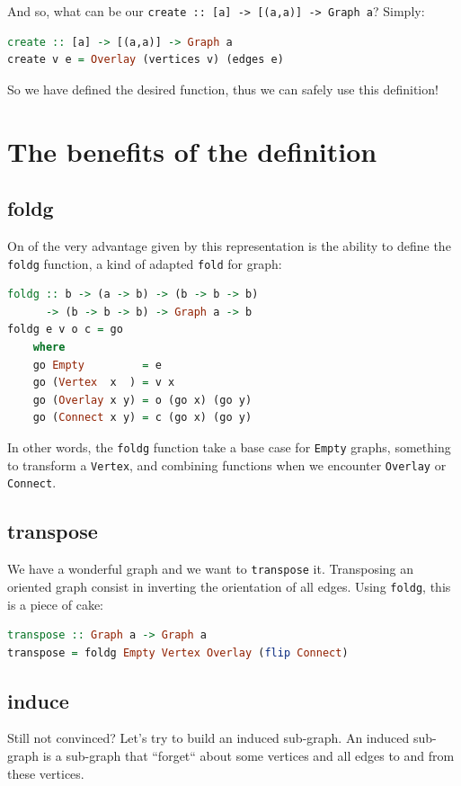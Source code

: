 \documentclass[10pt,a4paper]{article}
\begin{document}
And so, what can be our \verb|create :: [a] -> [(a,a)] -> Graph a|? Simply:
\begin{lstlisting}[language=Haskell, frame=single]
create :: [a] -> [(a,a)] -> Graph a
create v e = Overlay (vertices v) (edges e)
\end{lstlisting}

So we have defined the desired function, thus we can safely use this definition!

\section{The benefits of the definition}
\subsection{foldg}
On of the very advantage given by this representation is the ability to define the \verb|foldg| function, a kind of adapted \verb|fold| for graph:
\begin{lstlisting}[language=Haskell, frame=single]
foldg :: b -> (a -> b) -> (b -> b -> b)
      -> (b -> b -> b) -> Graph a -> b
foldg e v o c = go
	where
	go Empty         = e
	go (Vertex  x  ) = v x
	go (Overlay x y) = o (go x) (go y)
	go (Connect x y) = c (go x) (go y)
\end{lstlisting}
In other words, the \verb|foldg| function take a base case for \verb|Empty| graphs, something to transform a \verb|Vertex|, and combining functions when we encounter \verb|Overlay| or \verb|Connect|.

\subsection{transpose}

We have a wonderful graph and we want to \verb|transpose| it. Transposing an oriented graph consist in inverting the orientation of all edges. Using \verb|foldg|, this is a piece of cake:

\begin{lstlisting}[language=Haskell, frame=single]
transpose :: Graph a -> Graph a
transpose = foldg Empty Vertex Overlay (flip Connect)
\end{lstlisting}

\subsection{induce}

Still not convinced? Let's try to build an induced sub-graph. An induced sub-graph is a sub-graph that ``forget`` about some vertices and all edges to and from these vertices.
\end{document}
